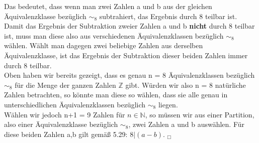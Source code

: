 \documentclass[11pt,a4paper]{article}
\begin{document}
Das bedeutet, dass wenn man zwei Zahlen a und b aus der gleichen Äquivalenzklasse bezüglich $\sim_8$ subtrahiert, das Ergebnis durch 8 teilbar ist. Damit das Ergebnis der Subtraktion zweier Zahlen a und b \textbf{nicht} durch 8 teilbar ist, muss man diese also aus verschiedenen Äquivalenzklassen bezüglich $\sim_8$ wählen. Wählt man dagegen zwei beliebige Zahlen aus derselben Äquivalenzklasse, ist das Ergebnis der Subtraktion dieser beiden Zahlen immer durch 8 teilbar. \\

Oben haben wir bereits gezeigt, dass es genau n = 8 Äquivalenzklassen bezüglich $\sim_8$ für die Menge der ganzen Zahlen $\mathbb{Z}$ gibt. Würden wir also n = 8 natürliche Zahlen betrachten, so könnte man diese so wählen, dass sie alle genau in unterschiedlichen Äquivalenzklassen bezüglich $\sim_8$ liegen. \\
Wählen wir jedoch n+1 = 9 Zahlen für $n \in \mathbb{N}$, so müssen wir aus einer Partition, also einer Äquivalenzklasse bezüglich $\sim_8$, zwei Zahlen a und b auswählen. Für diese beiden Zahlen a,b gilt gemäß 5.29: $8 | (a-b)$.    $_\Box$


\end{document}
